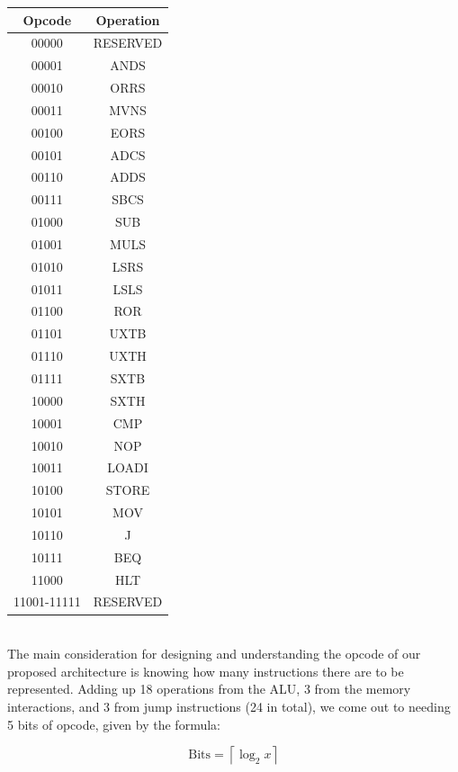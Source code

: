 \documentclass[9pt,a4paper,twoside]{tau}
\begin{document}
        \begingroup
        {\centering
        \begin{tabular}{c|c}
        \textbf{Opcode} & \textbf{Operation} \\ \hline
        00000 & RESERVED \\
        00001 & ANDS \\
        00010 & ORRS \\
        00011 & MVNS \\
        00100 & EORS \\
        00101 & ADCS \\
        00110 & ADDS \\
        00111 & SBCS \\
        01000 & SUB \\
        01001 & MULS \\
        01010 & LSRS \\
        01011 & LSLS \\
        01100 & ROR \\
        01101 & UXTB \\
        01110 & UXTH \\
        01111 & SXTB \\
        10000 & SXTH \\
        10001 & CMP \\
        10010 & NOP \\
        10011 & LOADI \\
        10100 & STORE \\
        10101 & MOV \\
        10110 & J \\
        10111 & BEQ \\
        11000 & HLT \\
        11001-11111 & RESERVED \\
        \end{tabular}}
        \\


        The main consideration for designing and understanding the opcode of our proposed architecture is knowing how many instructions there are to be represented. Adding up 18 operations from the ALU, 3 from the memory interactions, and 3 from jump instructions (24 in total), we come out to needing 5 bits of opcode, given by the formula:

        \begin{equation}
            \text{Bits} = \left\lceil \log_{2}{x} \right\rceil
        \end{equation}
\end{document}

